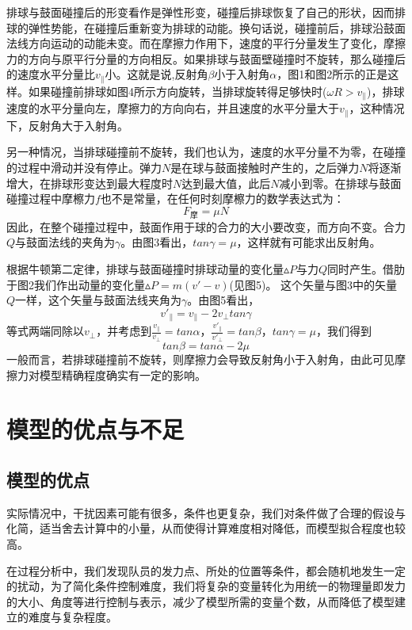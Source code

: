 \documentclass[withoutpreface,bwprint]{cumcmthesis} %
\begin{document}
排球与鼓面碰撞后的形变看作是弹性形变，碰撞后排球恢复了自己的形状，因而排球的弹性势能，在碰撞后重新变为排球的动能。换句话说，碰撞前后，排球沿鼓面法线方向运动的动能未变。而在摩擦力作用下，速度的平行分量发生了变化，摩擦力的方向与原平行分量的方向相反。如果排球与鼓面壁碰撞时不旋转，那么碰撞后的速度水平分量比$v_\parallel$小。这就是说,反射角$\beta$小于入射角$\alpha$，图1和图2所示的正是这样。如果碰撞前排球如图4所示方向旋转，当排球旋转得足够快时($\omega R>v_\parallel$)，排球速度的水平分量向左，摩擦力的方向向右，并且速度的水平分量大于$v_\parallel$，这种情况下，反射角大于入射角。

另一种情况，当排球碰撞前不旋转，我们也认为，速度的水平分量不为零，在碰撞的过程中滑动并没有停止。弹力$N$是在球与鼓面接触时产生的，之后弹力$N$将逐渐增大，在排球形变达到最大程度时$N$达到最大值，此后$N$减小到零。在排球与鼓面碰撞过程中摩檫力$f$也不是常量，在任何时刻摩檫力的数学表达式为：
\begin{equation*}
	F_\textrm{摩}=\mu N
\end{equation*}
因此，在整个碰撞过程中，鼓面作用于球的合力的大小要改变，而方向不变。合力$Q$与鼓面法线的夹角为$\gamma$。由图3看出，$tan\gamma=\mu$，这样就有可能求出反射角。

根据牛顿第二定律，排球与鼓面碰撞时排球动量的变化量$\vartriangle P$与力$Q$同时产生。借肋于图2我们作出动量的变化量$\vartriangle P=m(v'-v)$(见图5)。
这个矢量与图3中的矢量$Q$一样，这个矢量与鼓面法线夹角为$\gamma$。由图5看出，
\begin{equation*}
	v'_\parallel=v_\parallel-2v_\bot tan\gamma
\end{equation*}
等式两端同除以$v_\bot$，并考虑到$\frac{v_\parallel}{v_\bot}=tan\alpha$，$\frac{v'_\parallel}{v'_\bot}=tan\beta$，$tan\gamma=\mu$，我们得到
\begin{equation*}
	tan\beta=tan\alpha-2\mu
\end{equation*}
一般而言，若排球碰撞前不旋转，则摩擦力会导致反射角小于入射角，由此可见摩擦力对模型精确程度确实有一定的影响。
\section{模型的优点与不足}
\subsection{模型的优点}
实际情况中，干扰因素可能有很多，条件也更复杂，我们对条件做了合理的假设与化简，适当舍去计算中的小量，从而使得计算难度相对降低，而模型拟合程度也较高。

在过程分析中，我们发现队员的发力点、所处的位置等条件，都会随机地发生一定的扰动，为了简化条件控制难度，我们将复杂的变量转化为用统一的物理量即发力的大小、角度等进行控制与表示，减少了模型所需的变量个数，从而降低了模型建立的难度与复杂程度。
\end{document}
